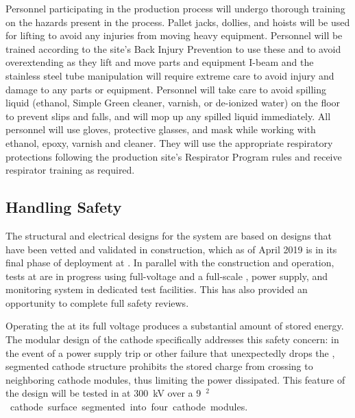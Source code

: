 Personnel participating in the production process will undergo thorough training %
on the hazards present in the process.  
Pallet jacks, dollies, and hoists will be used for lifting to avoid any injuries from moving heavy equipment. 
Personnel will be trained according to the site's Back Injury Prevention to use these and to avoid overextending as they lift and move parts and equipment  %
I-beam and the stainless steel tube manipulation will require %
extreme care to avoid injury %
and damage to any parts or equipment. 
Personnel will take care %
to avoid spilling liquid (ethanol, Simple Green\texttrademark{} cleaner, varnish, or de-ionized water) on the floor to prevent slips and falls, %
and will mop up  any spilled liquid %
immediately. 
All personnel will use gloves, protective glasses, and mask while working with ethanol, epoxy, varnish and cleaner. %
They %
will use the appropriate respiratory protections following the production site's Respirator Program rules and receive respirator training as
required.

\subsection{Handling Safety}
\label{sec:fddp-hv-transport-safety}

The structural and electrical designs for the   system are based on designs that have been  vetted and validated in  construction, which %
as of April 2019 is in its final phase of deployment at . In parallel with the  construction and operation,  tests at  are in progress using full-voltage and a full-scale  \fdth, power supply, and monitoring system in dedicated  test facilities. This has also provided an opportunity to complete full safety reviews. 

Operating the  at its full %
voltage produces a substantial amount of stored energy. The modular design of the cathode specifically addresses this safety concern: in the event of a power supply trip or other failure that unexpectedly drops the , %
segmented cathode structure prohibits the stored charge from crossing to neighboring cathode modules, thus limiting the power dissipated. 
This feature of the design will be tested in  at \SI{300}{kV} over a \SI{9}{\m$^2$} cathode surface segmented into four cathode modules. 

